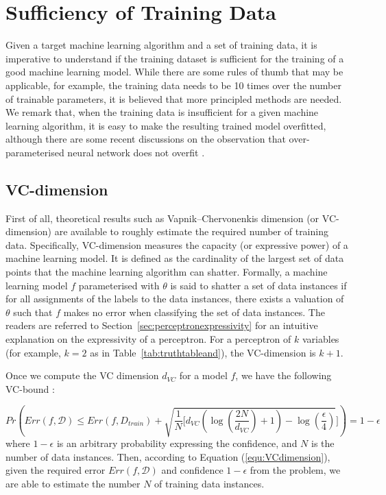 \section{Sufficiency of Training Data}\label{sec:trainingsufficiency}

Given a target machine learning algorithm and a set of training data, it is imperative to understand if the training dataset is sufficient for the training of a good machine learning model. While there are some rules of thumb that may be applicable, for example, the training data needs to be 10 times over the number of trainable parameters, it is believed that more principled methods are needed. We remark that, when the training data is insufficient for a given machine learning algorithm, it is easy to make the resulting trained model overfitted, although there are some recent discussions on the observation that over-parameterised neural network does not overfit \cite{NEURIPS2019_62dad6e2}. 

\subsection*{VC-dimension}

First of all, theoretical results such as Vapnik–Chervonenkis dimension (or VC-dimension) are available to roughly estimate the required number of training data. Specifically, VC-dimension measures the capacity (or expressive power) of a machine learning model. It is defined as the cardinality of the largest set of data points that the machine learning algorithm can shatter. Formally, a machine learning model $f$ parameterised with $\theta$ is said to shatter a set of data instances if for all assignments of the labels to the data instances, there exists a valuation of $\theta$ such that $f$ makes no error when classifying the set of data instances. The readers are referred to Section~\ref{sec:perceptronexpressivity} for an intuitive explanation on the expressivity of a perceptron. For a perceptron of $k$ variables (for example, $k=2$ as in Table~\ref{tab:truthtableand}), the VC-dimension is $k+1$.  

Once we compute the VC dimension $d_{VC}$ for a model $f$, we have the following VC-bound \cite{Vapnik2015}: 

\begin{equation}\label{equ:VCdimension}
    \displaystyle Pr\left( Err(f,\mathcal{D}) \leq Err(f,D_{train}) + \sqrt{\frac{1}{N}[ d_{VC}(\log(\frac{2N}{d_{VC}})+1)-\log(\frac{\epsilon}{4})}]\right ) = 1 - \epsilon 
\end{equation}
where $1-\epsilon$ is an arbitrary probability expressing the confidence, and $N$ is the number of data instances. Then, according to Equation (\ref{equ:VCdimension}), given the required error $Err(f,\mathcal{D})$ and confidence $1-\epsilon$ from the problem, we are able to estimate the number $N$ of training data instances. 

